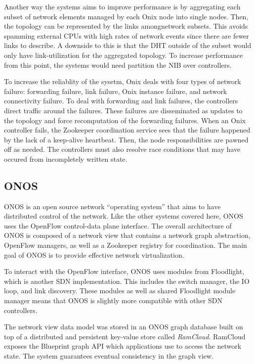 \documentclass[letterpaper,twocolumn,10pt]{article}
\begin{document}
Another way the systems aims to improve performance is by aggregating each subset of network elements managed by each Onix node into single nodes. Then, the topology can be represented by the links amongnetwork subsets. This avoids spamming external CPUs with high rates of network events since there are fewer links to describe. A downside to this is that the DHT outside of the subset would only have link-utilization for the aggregated topology. To increase performance from this point, the systems would need partition the NIB over controllers.

To increase the reliablity of the sysetm, Onix deals with four types of network failure: forwarding failure, link failure, Onix instance failure, and network connectivity failure. To deal with forwarding and link failures, the controllers direct traffic around the failures. These failures are disseminated as updates to the topology and force recomputation of the forwarding failures. When an Onix controller fails, the Zookeeper coordination service sees that the failure happened by the lack of a keep-alive heartbeat. Then, the node responsibilities are pawned off as needed. The controllers must also resolve race conditions that may have occured from incompletely written state.
    
\subsection{ONOS}

ONOS is an open source network ``operating system'' that aims to have distributed control of the network. Like the other systems covered here, ONOS uses the OpenFlow control-data plane interface. The overall architecture of ONOS is composed of a network view that contains a network graph abstraction, OpenFlow managers, as well as a Zookeeper registry for coordination. The main goal of ONOS is to provide effective network virtualization.\cite{berde2014onos}

To interact with the OpenFlow interface, ONOS uses modules from Floodlight, which is another SDN implementation. This includes the switch manager, the IO loop, and link discovery. These modules as well as shared Floodlight module manager means that ONOS is slightly more compatible with other SDN controllers.

The network view data model was stored in an ONOS graph database built on top of a distributed and persistent key-value store called \emph{RamCloud}. RamCloud exposes the Blueprint graph API which applications use to access the network state. The system guarantees eventual consistency in the graph view.\cite{berde2014onos} 
\end{document}
